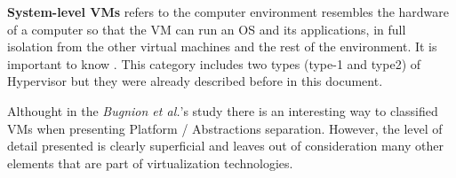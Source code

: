     \textbf{System-level VMs} refers to the computer environment resembles the hardware of a computer so that the VM can run an OS and its applications, in full isolation from the other virtual machines and the rest of the environment. It is important to know \cite{Bugnion2017}. This category includes two types (type-1 and type2) of Hypervisor but they were already described before in this document.
    
	Althought in the \textit{Bugnion et al.}'s study \cite{Bugnion2017} there is an interesting way to classified VMs when presenting Platform / Abstractions separation. However, the level of detail presented is clearly superficial and leaves out of consideration many other elements that are part of virtualization technologies.
	
	